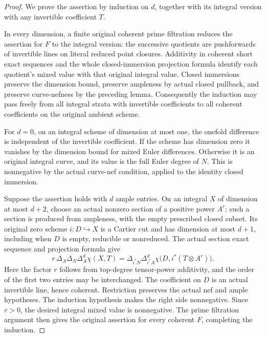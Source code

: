 \begin{proof}
We prove the assertion by induction on $d$, together with its
integral version with any invertible coefficient $T$.

In every dimension, a finite original coherent prime filtration
reduces the assertion for $F$ to the integral version: the successive
quotients are pushforwards of invertible lines on literal reduced
point closures. Additivity in coherent short exact sequences and the
whole closed-immersion projection formula identify each quotient's
mixed value with that original integral value. Closed immersions
preserve the dimension bound, preserve ampleness by actual closed
pullback, and preserve curve-nefness by the preceding lemma.
Consequently the induction may pass freely from all integral strata
with invertible coefficients to all coherent coefficients on the
original ambient scheme.

For $d=0$, on an integral scheme of dimension at most one, the
onefold difference is independent of the invertible coefficient.
If the scheme has dimension zero it vanishes by the dimension bound
for mixed Euler differences. Otherwise it is an original integral
curve, and its value is the full Euler degree of $N$. This is
nonnegative by the actual curve-nef condition, applied to the
identity closed immersion.

Suppose the assertion holds with $d$ ample entries. On an integral
$X$ of dimension at most $d+2$, choose an actual nonzero section of
a positive power $A^r$; such a section is produced from ampleness,
with the empty prescribed closed subset. Its original zero scheme
$i:D\hookrightarrow X$ is a Cartier cut and has dimension at most
$d+1$, including when $D$ is empty, reducible or nonreduced.
The actual section exact sequence and projection formula give
\[
 r\,\Delta_A\Delta_N\Delta_A^d\chi(X,T)
 =\Delta_{i^*N}\Delta_{i^*A}^d
     \chi\bigl(D,i^*(T\otimes A^r)\bigr).
\]
Here the factor $r$ follows from top-degree tensor-power additivity,
and the order of the first two entries may be interchanged. The
coefficient on $D$ is an actual invertible line, hence coherent.
Restriction preserves the actual nef and ample hypotheses. The
induction hypothesis makes the right side nonnegative. Since
$r>0$, the desired integral mixed value is nonnegative. The prime
filtration argument then gives the original assertion for every
coherent $F$, completing the induction.
\end{proof}
